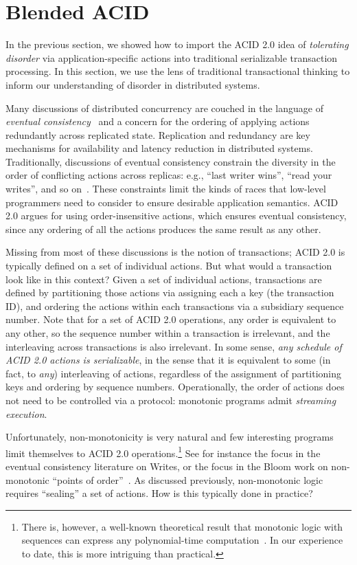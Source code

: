 \documentclass{sig-alternate}
\begin{document}
\section{Blended ACID}
In the previous section, we showed how to import the ACID 2.0 idea of
\emph{tolerating disorder} via application-specific actions into traditional
serializable transaction processing. In this section, we use the lens of
traditional transactional thinking to inform our understanding of disorder in
distributed systems.

Many discussions of distributed concurrency are couched in the language of
\emph{eventual consistency}~\cite{Terry1995} and a concern for the ordering of
applying actions redundantly across replicated state.  Replication and
redundancy are key mechanisms for availability and latency reduction in
distributed systems.  Traditionally, discussions of eventual consistency
constrain the diversity in the order of conflicting actions across replicas:
e.g., ``last writer wins'', ``read your writes'', and so on~\cite{Terry1994}.
These constraints limit the kinds of races that low-level programmers need to
consider to ensure desirable application semantics.  ACID 2.0 argues for using
order-insensitive actions, which ensures eventual consistency, since any
ordering of all the actions produces the same result as any other.

Missing from most of these discussions is the notion of transactions; ACID 2.0
is typically defined on a set of individual actions.  But what would a
transaction look like in this context?  Given a set of individual actions,
transactions are defined by partitioning those actions via assigning each a key
(the transaction ID), and ordering the actions within each transactions via a
subsidiary sequence number.  Note that for a set of ACID 2.0 operations, any
order is equivalent to any other, so the sequence number within a transaction is
irrelevant, and the interleaving across transactions is also irrelevant.  In
some sense, \emph{any schedule of ACID 2.0 actions is serializable}, in the
sense that it is equivalent to some (in fact, to \emph{any}) interleaving of
actions, regardless of the assignment of partitioning keys and ordering by
sequence numbers.  Operationally, the order of actions does not need to be
controlled via a protocol: monotonic programs admit \emph{streaming execution}.

Unfortunately, non-monotonicity is very natural and few interesting programs
limit themselves to ACID 2.0 operations.\footnote{There is, however, a
  well-known theoretical result that monotonic logic with sequences can express
  any polynomial-time computation~\cite{immerman-ptime}.  In our experience to
  date, this is more intriguing than practical.}  See for instance the focus in
the eventual consistency literature on Writes, or the focus in the Bloom work on
non-monotonic ``points of order''~\cite{Alvaro2011}.  As discussed previously,
non-monotonic logic requires ``sealing'' a set of actions.  How is this
typically done in practice?
\end{document}
